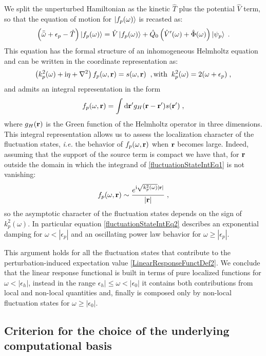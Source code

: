 \documentclass[a4paper]{article}
\newcommand{\dd}{{\rm d}}
\renewcommand{\r}{{\bf r}}
\newcommand{\eps}{\epsilon}
\newcommand{\bbomega}{{\bar{\bar\omega}}}
\newcommand{\ii}{\mathrm{i}}
\newcommand{\be}{\begin{equation}}
\newcommand{\ee}{\end{equation}}
\newcommand{\lb}{\label}
\newcommand{\op}[1]{\hat {#1}}
\begin{document}
We split the unperturbed Hamiltonian as the kinetic $\op T$ plus the potential $\op V$ term, so that the equation of motion for $\ket{f_p(\omega)}$ is recasted as:
\be\lb{fluctuationStateEqMotion}
\left(\bbomega+\eps_p -\op T\right)\ket{f_p(\omega)} = \op V\ket{f_p(\omega)} + \op Q_0\left(\op V'(\omega) + \op \Phi(\omega)\right)\ket{\psi_p} \;.
\ee
This equation has the formal structure of an inhomogeneous Helmholtz equation and can be written in the coordinate representation as:
\be
\left(k^2_p(\omega)+\ii\eta + \nabla^2\right)f_p(\omega,\r) = s(\omega,\r) \;\;, {\rm with} \;\; k^2_p(\omega) = 2(\omega+\eps_p) \;,
\ee
and admits an integral representation in the form
\be\lb{fluctuationStateIntEq1}
f_p(\omega,\r) = \int \dd\r' g_H(\r-\r')s(\r') \;,
\ee
where $g_H(\r)$ is the Green function of the Helmholtz operator in three dimensions. This integral representation allows us to assess the localization character 
of the fluctuation states, \emph{i.e.} the behavior of $f_p(\omega,\r)$ when $\r$ becomes large. Indeed, assuming that the support of the source term is compact
we have that, for $\r$ outside the domain in which the integrand of \eqref{fluctuationStateIntEq1} is not vanishing:
\be\lb{fluctuationStateIntEq2}
f_p(\omega,\r) \sim \frac{e^{\ii \sqrt{k^2_p(\omega)} |\r|}}{|\r|} \;,
\ee
so the asymptotic character of the fluctuation states depends on the sign of $k^2_p(\omega)$. In particular equation \eqref{fluctuationStateIntEq2} describes an
exponential damping for $\omega < |\eps_p|$ and an oscillating power law behavior for $\omega \geq |\eps_p|$.  

This argument holds for all the fluctuation states that contribute to the perturbation-induced expectation value \eqref{LinearResponseFunctDef2}. We conclude that
the linear response functional is built in terms of pure localized functions for $\omega < |\eps_h|$, instead in the range $\eps_h|\leq\omega<|\eps_0|$ it contains both
contributions from local and non-local quantities and, finally is composed only by non-local fluctuation states for $\omega\geq|\eps_0|$. 

\subsection{Criterion for the choice of the underlying computational basis}
\end{document}
